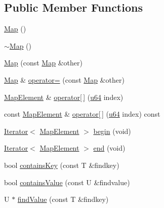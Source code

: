 \subsection*{Public Member Functions}
\begin{DoxyCompactItemize}
\item 
\hyperlink{classcrap_1_1container_1_1_map_ac936828e1f1f2eed5ba5feb212025a3d}{Map} ()
\item 
\hyperlink{classcrap_1_1container_1_1_map_a82ef9798fe442f1ae4a1627243af71cc}{$\sim$\-Map} ()
\item 
\hyperlink{classcrap_1_1container_1_1_map_a98eb0b1e2ee7c07cffe0972cd090b220}{Map} (const \hyperlink{classcrap_1_1container_1_1_map}{Map} \&other)
\item 
\hyperlink{classcrap_1_1container_1_1_map}{Map} \& \hyperlink{classcrap_1_1container_1_1_map_a9d4ca88cbce44c76df84b373e3aa9bea}{operator=} (const \hyperlink{classcrap_1_1container_1_1_map}{Map} \&other)
\item 
\hyperlink{classcrap_1_1container_1_1_map_a87121369de54f6650c8a84a0a19fab32}{Map\-Element} \& \hyperlink{classcrap_1_1container_1_1_map_acdc514785ee32d6e0044f16756354a47}{operator\mbox{[}$\,$\mbox{]}} (\hyperlink{types_8h_a3f7e2bcbb0b4c338f3c4f6c937cd4234}{u64} index)
\item 
const \hyperlink{classcrap_1_1container_1_1_map_a87121369de54f6650c8a84a0a19fab32}{Map\-Element} \& \hyperlink{classcrap_1_1container_1_1_map_ac35870054de6a0137728f9012d7c59aa}{operator\mbox{[}$\,$\mbox{]}} (\hyperlink{types_8h_a3f7e2bcbb0b4c338f3c4f6c937cd4234}{u64} index) const 
\item 
\hyperlink{class_iterator}{Iterator}$<$ \hyperlink{classcrap_1_1container_1_1_map_a87121369de54f6650c8a84a0a19fab32}{Map\-Element} $>$ \hyperlink{classcrap_1_1container_1_1_map_ae7cc145818348772ff62cc0adae32bb4}{begin} (void)
\item 
\hyperlink{class_iterator}{Iterator}$<$ \hyperlink{classcrap_1_1container_1_1_map_a87121369de54f6650c8a84a0a19fab32}{Map\-Element} $>$ \hyperlink{classcrap_1_1container_1_1_map_a90907bcb7668c9f3f2f6506ade64416c}{end} (void)
\item 
bool \hyperlink{classcrap_1_1container_1_1_map_ad1eb2083895604cb51820cad9837b6ee}{contains\-Key} (const T \&findkey)
\item 
bool \hyperlink{classcrap_1_1container_1_1_map_a50f1cc76a8f4bb831985a3fcdecb40f1}{contains\-Value} (const U \&findvalue)
\item 
U $\ast$ \hyperlink{classcrap_1_1container_1_1_map_af1452bbe558248c670745aaee6bfb4af}{find\-Value} (const T \&findkey)

\end{DoxyCompactItemize}
